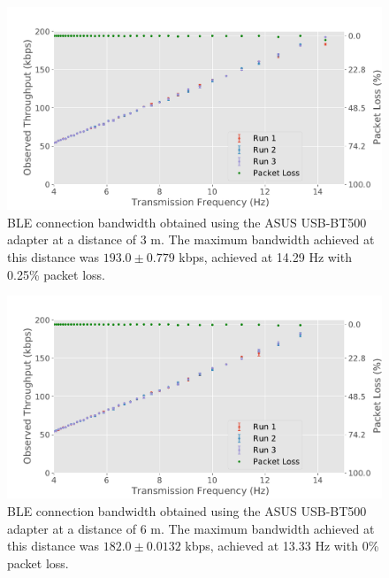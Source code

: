 \begin{figure}[H]
    \centering
    \includegraphics[width=0.9\linewidth]{images/ble-bandwidth-hci0-300cm.pdf}
    \caption[\acs{BLE} connection bandwidth obtained using the ASUS USB-BT500 adapter at a distance of 3 m.]{\acs{BLE} connection bandwidth obtained using the ASUS USB-BT500 adapter at a distance of $3\text{ m}$. The maximum bandwidth achieved at this distance was $193.0 \pm 0.779$ kbps, achieved at 14.29 Hz with 0.25\% packet loss.}
    \label{fig:ble-bandwidth-hci0-3m}
\end{figure}

\begin{figure}[H]
    \centering
    \includegraphics[width=0.9\linewidth]{images/ble-bandwidth-hci0-600cm.pdf}
    \caption[\acs{BLE} connection bandwidth obtained using the ASUS USB-BT500 adapter at a distance of 6 m.]{\acs{BLE} connection bandwidth obtained using the ASUS USB-BT500 adapter at a distance of $6\text{ m}$. The maximum bandwidth achieved at this distance was $182.0 \pm 0.0132$ kbps, achieved at 13.33  Hz with 0\% packet loss.}
    \label{fig:ble-bandwidth-hci0-6m}
\end{figure}

